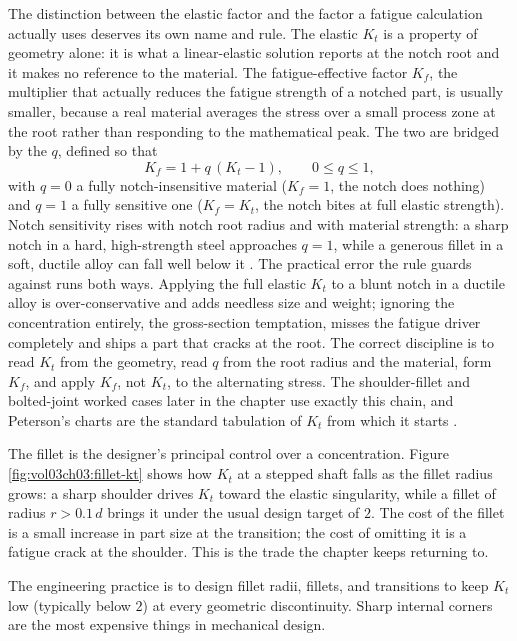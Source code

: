 The distinction between the elastic factor and the factor a fatigue
calculation actually uses deserves its own name and rule. The elastic
$K_t$ is a property of geometry alone: it is what a linear-elastic
solution reports at the notch root and it makes no reference to the
material. The fatigue-effective factor $K_f$, the multiplier that
actually reduces the fatigue strength of a notched part, is usually
smaller, because a real material averages the stress over a small process
zone at the root rather than responding to the mathematical peak. The two
are bridged by the  $q$, defined so that
\[
K_f = 1 + q\,(K_t - 1), \qquad 0 \le q \le 1,
\]
with $q = 0$ a fully notch-insensitive material ($K_f = 1$, the notch does
nothing) and $q = 1$ a fully sensitive one ($K_f = K_t$, the notch bites
at full elastic strength). Notch sensitivity rises with notch root radius
and with material strength: a sharp notch in a hard, high-strength steel
approaches $q = 1$, while a generous fillet in a soft, ductile alloy can
fall well below it \cite[ch.~7]{text:dowling-mechanical-behavior}. The
practical error the rule guards against runs both ways. Applying the full
elastic $K_t$ to a blunt notch in a ductile alloy is over-conservative and
adds needless size and weight; ignoring the concentration entirely, the
gross-section temptation, misses the fatigue driver completely and ships a
part that cracks at the root. The correct discipline is to read $K_t$ from
the geometry, read $q$ from the root radius and the material, form $K_f$,
and apply $K_f$, not $K_t$, to the alternating stress. The shoulder-fillet
and bolted-joint worked cases later in the chapter use exactly this chain,
and Peterson's charts are the standard tabulation of $K_t$ from which it
starts \cite[introduction]{text:peterson-davie}.



The fillet is the designer's principal control over a concentration.
Figure \ref{fig:vol03ch03:fillet-kt} shows how $K_t$ at a stepped shaft
falls as the fillet radius grows: a sharp shoulder drives $K_t$ toward
the elastic singularity, while a fillet of radius $r > 0.1\,d$ brings it
under the usual design target of $2$. The cost of the fillet is a small
increase in part size at the transition; the cost of omitting it is a
fatigue crack at the shoulder. This is the trade the chapter keeps
returning to.

The engineering practice is to design fillet radii, fillets, and
transitions to keep $K_t$ low (typically below $2$) at every
geometric discontinuity. Sharp internal corners are the most
expensive things in mechanical design.

